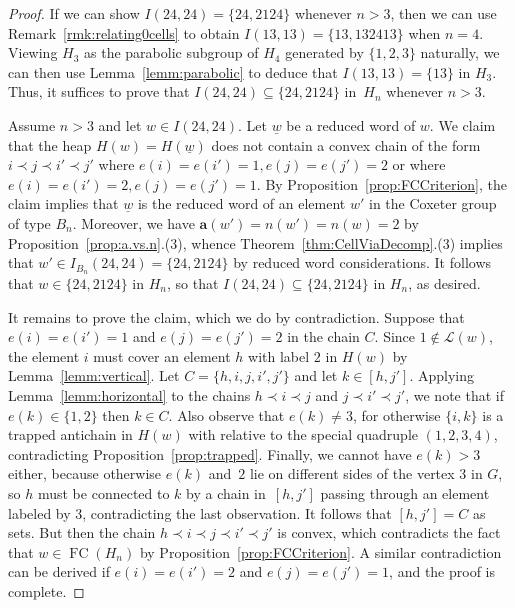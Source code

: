 \documentclass[ALCO,Unicode,published]{cedram}
\newcommand{\call}{\mathcal{L}}
\newcommand{\la}{\mathbf{a}}
\newcommand{\ul}{\underline}
\newcommand{\se}{\subseteq}
\DeclareMathOperator{\fc}{\mathrm{FC}}
\begin{document}
\begin{proof}
  If we can show $I(24,24)=\{24,2124\}$ whenever $n>3$, then we can use Remark~\ref{rmk:relating0cells} to
  obtain $I(13,13)=\{13,132413\}$ when $n=4$.  Viewing $H_3$ as the parabolic subgroup of $H_4$
  generated by $\{1,2,3\}$ naturally, we can then use Lemma~\ref{lemm:parabolic} to deduce that
  $I(13,13)=\{13\}$ in $H_3$. Thus, it suffices to prove that $I(24,24)\se \{24,2124\}$ in~$H_n$
  whenever $n>3$. 

  Assume $n>3$ and let $w\in I(24,24)$. Let $\ul w$ be a reduced word of $w$.  We claim that the
  heap $H(w)=H(\ul w)$ does not contain a convex chain of the form $i\prec j\prec i'\prec j'$ where
  $e(i)=e(i')=1,e(j)=e(j')=2$ or where $e(i)=e(i')=2, e(j)=e(j')=1$. By Proposition~\ref{prop:FCCriterion}, the
  claim implies that $\ul w$ is the reduced word of an element $w'$ in the Coxeter group of type
  $B_n$. Moreover, we have $\la(w')=n(w')=n(w)=2$ by Proposition~\ref{prop:a.vs.n}.(3),  whence
  Theorem~\ref{thm:CellViaDecomp}.(3) implies that $w'\in I_{B_n}(24,24)=\{24,2124\}$ by reduced word
  considerations. It follows that $w\in \{24,2124\}$ in $H_n$, so that $I(24,24)\se \{24,2124\}$ in
  $H_n$, as desired. 

  It remains to prove the claim, which we do by contradiction. Suppose that $e(i)=e(i')=1$ and
  $e(j)=e(j')=2$ in the chain $C$. Since $1\notin\call(w)$, the element $i$ must cover an element
  $h$ with label $2$ in $H(w)$ by Lemma~\ref{lemm:vertical}. Let $C=\{h,i,j,i',j'\}$ and let $k\in
  [h,j']$. Applying Lemma~\ref{lemm:horizontal} to the chains $h\prec i\prec j$ and $j\prec i'\prec j'$,
  we note that if~$e(k)\in \{1,2\}$ then $k\in C$. Also observe that $e(k)\neq 3$, for otherwise
  $\{i,k\}$ is a trapped antichain in $H(w)$ with relative to the special quadruple $(1,2,3,4)$,
  contradicting Proposition~\ref{prop:trapped}.  Finally, we cannot have $e(k)>3$ either, because otherwise
  $e(k)$ and~$2$ lie on different sides of the vertex 3 in $G$, so $h$ must be connected to $k$ by a
  chain in~$[h,j']$ passing through an element labeled by 3, contradicting the last observation.  It
  follows that $[h,j']=C$ as sets.  But then the chain $h\prec i\prec j\prec i'\prec j'$ is convex,
  which contradicts the fact that $w\in \fc(H_n)$ by Proposition~\ref{prop:FCCriterion}. A similar
  contradiction can be derived if $e(i)=e(i')=2$ and $e(j)=e(j')=1$, and the proof is complete. 
\end{proof}






\end{document}

